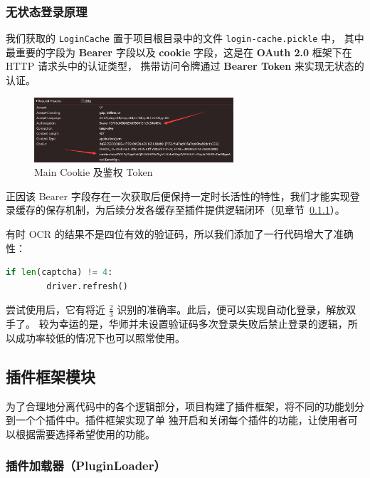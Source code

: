 \documentclass[14pt,a4paper,UTF8,twoside]{article}
\begin{document}
\newpage{} %

\subsubsection{无状态登录原理}

我们获取的 \texttt{LoginCache} 置于项目根目录中的文件 \texttt{login-cache.pickle} 中，
其中最重要的字段为 \textbf{Bearer} 字段以及 \textbf{cookie} 字段，这是在 \textbf{OAuth 2.0} 框架下在 HTTP 请求头中的认证类型，
携带访问令牌通过 \textbf{Bearer Token} 来实现无状态的认证。

\begin{figure}[H]
    \centering
    \includegraphics[width=0.66\textwidth]{img/main_cache.png}
    \caption{Main Cookie 及鉴权 Token}
    \label{fig:main_cache}
\end{figure}

正因该 Bearer 字段存在一次获取后便保持一定时长活性的特性，我们才能实现登录缓存的保存机制，为后续分发各缓存至插件提供逻辑闭环（见章节\ \ref{subsec:plugin_loader}）。

有时 OCR 的结果不是四位有效的验证码，所以我们添加了一行代码增大了准确性：

\begin{lstlisting}[language=Python]
    if len(captcha) != 4:
        driver.refresh()
\end{lstlisting}

尝试使用后，它有将近 $\frac{2}{3}$ 识别的准确率。此后，便可以实现自动化登录，解放双手了。
较为幸运的是，华师并未设置验证码多次登录失败后禁止登录的逻辑，所以成功率较低的情况下也可以照常使用。

\subsection{插件框架模块}

为了合理地分离代码中的各个逻辑部分，项目构建了插件框架，将不同的功能划分到一个个插件中。插件框架实现了单
独开启和关闭每个插件的功能，让使用者可以根据需要选择希望使用的功能。

\subsubsection{插件加载器（PluginLoader）}\label{subsec:plugin_loader}
\end{document}
